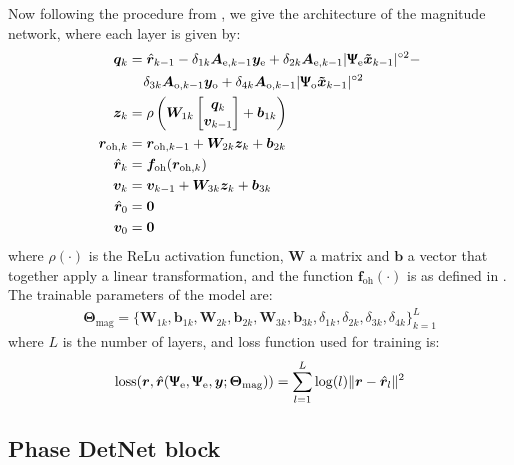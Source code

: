 Now following the procedure from \cite{Neev_2019}, we give the architecture of the magnitude network, where each layer is given by:
\begin{align}
	\bm q_k& = \hat{\bm{r}}_{k-1} -\delta_{1k}\bm A_{\text{e},k-1}\bm y_\text{e} +\delta_{2k}\bm A_{\text{e},k-1}|\bm{\bm{\Uppsi}_\text{e}\tilde{x}}_{k-1}|^{\circ2}-\nonumber\\
	&\;\;\;\;\delta_{3k}\bm A_{\text{o},k-1}\bm y_\text{o} +\delta_{4k}\bm A_{\text{o},k-1}|\bm{\bm{\Uppsi}_\text{o}\tilde{x}}_{k-1}|^{\circ2}\\
	\bm z_k&=\rho\left( \bm W_{1k}\begin{bmatrix}\bm q_k\\\bm v_{k-1}\end{bmatrix}+\bm b_{1k}\right)\\
	\bm{r}_{\text{oh},k} &= \bm{r}_{\text{oh},k-1}+\bm W_{2k}\bm z_k+\bm b_{2k}\\
	\hat{\bm{r}}_{k} &= \bm f_{\text{oh}}(\bm{r}_{\text{oh},k})\\
	\bm v_k&=\bm v_{k-1}+\bm W_{3k}\bm z_k+\bm b_{3k}\\
	\hat{\bm{r}}_{0} &= \bm 0\\
	\bm v_0&=\bm 0\\
\end{align}
where $\rho(\cdot)$ is the ReLu activation function, $\bm W$ a matrix and $\bm b$ a vector that together apply a linear transformation, and  the function $\bm f_{\text{oh}}(\cdot)$ is as defined in \cite{Neev_2019}.\\

The trainable parameters of the model are:
\begin{align}
	\bm \Theta_\text{mag} = \bigl\{\bm W_{1k},\bm b_{1k},\bm W_{2k},\bm b_{2k},\bm W_{3k},\bm b_{3k},\delta_{1k},\delta_{2k},\delta_{3k},\delta_{4k}  \bigr\}_{k=1}^L
\end{align}
where $L$ is the number of layers, and loss function used for training is:
\begin{align}
	\text{loss}(\bm r, \hat{\bm r}(\bm{\Uppsi}_\text{e},\bm{\Uppsi}_\text{e},\bm y;\bm \Theta_\text{mag}))=\sum_{l=1}^L\log(l)\lVert \bm r-\hat{\bm{r}}_{l}\rVert^2
\end{align}


\subsection{Phase DetNet block}

